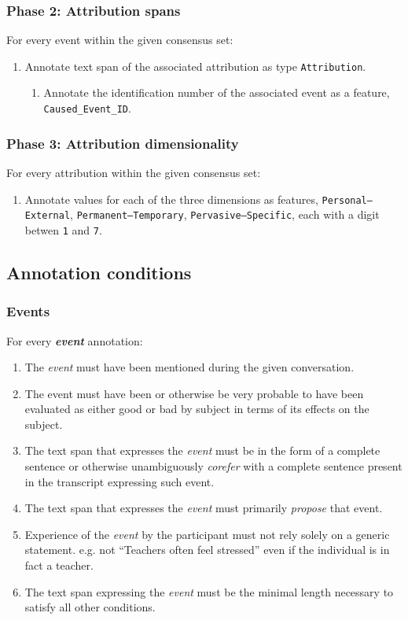 \documentclass[a4paper,12pt]{article}
\begin{document}
    \subsubsection{Phase 2: Attribution spans}
    For every event within the given consensus set:
        \begin{enumerate}
            \item Annotate text span of the associated attribution as type \texttt{Attribution}.
                \begin{enumerate}
                    \item Annotate the identification number of the associated event as a feature, \texttt{Caused\_Event\_ID}.
                \end{enumerate}
        \end{enumerate}
    \subsubsection{Phase 3: Attribution dimensionality}
    For every attribution within the given consensus set:
        \begin{enumerate}
            \item Annotate values for each of the three dimensions as features, \texttt{Personal--External}, \texttt{Permanent--Temporary}, \texttt{Pervasive--Specific}, each with a digit betwen \texttt{1} and \texttt{7}.
        \end{enumerate}

    \newpage
    \subsection{Annotation conditions}
    \subsubsection{Events}
    For every \textbf{\emph{event}} annotation:
        \begin{enumerate}
            \item The \emph{event} must have been mentioned during the given conversation.
            \item The event must have been or otherwise be very probable to have been evaluated as either good or bad by subject in terms of its effects on the subject.
            \item The text span that expresses the \emph{event} must be in the form of a complete sentence or otherwise unambiguously \emph{corefer} with a complete sentence present in the transcript expressing such event.
            \item The text span that expresses the \emph{event} must primarily \emph{propose} that event. %
            \item Experience of the \emph{event} by the participant must not rely solely on a generic statement.
                e.g. not ``Teachers often feel stressed'' even if the individual is in fact a teacher.
            \item The text span expressing the \emph{event} must be the minimal length necessary to satisfy all other conditions.
        \end{enumerate}
\end{document}

